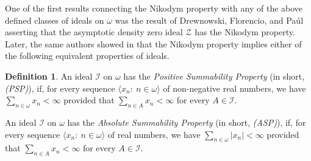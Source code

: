 \documentclass[a4paper,11pt,fleqn]{amsart}
\newtheorem{lemma}[theorem]{Lemma}
\theoremstyle{definition}
\newtheorem{definition}[theorem]{Definition}
\theoremstyle{remark}
\numberwithin{equation}{section}
\newcommand{\N}{\mathbb{N}}
\newcommand{\aA}{\mathcal{A}}
\newcommand{\fF}{\mathcal{F}}
\newcommand{\iI}{\mathcal{I}}
\newcommand{\zZ}{\mathcal{Z}}
\newcommand{\rstr}{\restriction}
\newcommand{\sub}{\subseteq}
\DeclareMathOperator{\supp}{supp}
\newcommand{\seqn}[1]{\big\langle#1\colon\ n\io\big\rangle}
\newcommand{\clopen}[1]{\left[#1\right]}
\newcommand{\io}{\in\omega}%
\begin{document}


\medskip

One of the first results connecting the Nikodym property with any of the above defined classes of ideals on $\omega$ was the result of Drewnowski, Florencio, and Pa\'ul \cite[Proposition 6]{DFP94} asserting that the asymptotic density zero ideal $\zZ$ has the Nikodym property. Later, the same authors showed in \cite[Corollary 2.3]{DFP96} that the Nikodym property implies either of the following equivalent properties of ideals.

\begin{definition}\label{def:psp_asp}
    An ideal $\iI$ on $\omega$ has the \textit{Positive Summability Property} (in short, \textit{(PSP)}), if, for every sequence $\seqn{x_n}$ of non-negative real numbers, we have $\sum_{n\io}x_n<\infty$ provided that $\sum_{n\in A}x_n<\infty$ for every $A\in\iI$.

    An ideal $\iI$ on $\omega$ has the \textit{Absolute Summability Property} (in short, \textit{(ASP)}), if, for every sequence $\seqn{x_n}$ of real numbers, we have $\sum_{n\io}\big|x_n\big|<\infty$ provided that $\sum_{n\in A}x_n<\infty$ for every $A\in\iI$.
\end{definition}
\end{document}
